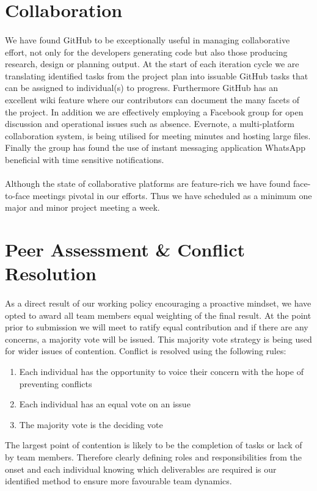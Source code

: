 \documentclass[11pt,a4paper]{article}
\begin{document}
\section{Collaboration}
\paragraph{}
We have found GitHub to be exceptionally useful in managing collaborative effort, not only for the developers generating code but also those producing research, design or planning output.  At the start of each iteration cycle we are translating identified tasks from the project plan into issuable GitHub tasks that can be assigned to individual(s) to progress.  Furthermore GitHub has an excellent wiki feature where our contributors can document the many facets of the project.
\newline
In addition we are effectively employing a Facebook group for open discussion and operational issues such as absence.  Evernote, a multi-platform collaboration system, is being utilised for meeting minutes and hosting large files.  Finally the group has found the use of instant messaging application WhatsApp beneficial with time sensitive notifications.
\paragraph{}
Although the state of collaborative platforms are feature-rich we have found face-to-face meetings pivotal in our efforts.  Thus we have scheduled as a minimum one major and minor project meeting a week.

\section{Peer Assessment \& Conflict Resolution}
\paragraph{}
As a direct result of our working policy encouraging a proactive mindset, we have opted to award all team members equal weighting of the final result.  At the point prior to submission we will meet to ratify equal contribution and if there are any concerns, a majority vote will be issued.
This majority vote strategy is being used for wider issues of contention.  Conflict is resolved using the following rules:

\begin{enumerate}
  \item Each individual has the opportunity to voice their concern with the hope of preventing conflicts
  \item Each individual has an equal vote on an issue
  \item The majority vote is the deciding vote
\end{enumerate}

The largest point of contention is likely to be the completion of tasks or lack of by team members.  Therefore clearly defining roles and responsibilities from the onset and each individual knowing which deliverables are required is our identified method to ensure more favourable team dynamics.
\end{document}
